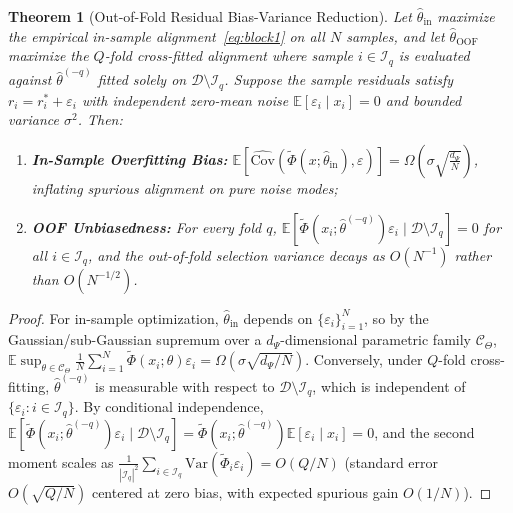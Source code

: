 \documentclass[11pt]{article}
\newtheorem{theorem}{Theorem}
\newcommand{\E}{\mathbb{E}}
\newcommand{\abs}[1]{\left\lvert #1 \right\rvert}
\begin{document}
\begin{theorem}[Out-of-Fold Residual Bias-Variance Reduction]
\label{thm:oof}
Let $\hat{\theta}_{\mathrm{in}}$ maximize the empirical in-sample alignment~\eqref{eq:block1} on all $N$ samples, and let $\hat{\theta}_{\mathrm{OOF}}$ maximize the $Q$-fold cross-fitted alignment where sample $i \in \mathcal{I}_q$ is evaluated against $\hat{\theta}^{(-q)}$ fitted solely on $\mathcal{D} \setminus \mathcal{I}_q$. Suppose the sample residuals satisfy $r_i = r_i^* + \varepsilon_i$ with independent zero-mean noise $\E[\varepsilon_i \mid x_i] = 0$ and bounded variance $\sigma^2$. Then:
\begin{enumerate}
    \item \textbf{In-Sample Overfitting Bias:} $\E[\hat{\mathrm{Cov}}(\tilde{\Phi}(x; \hat{\theta}_{\mathrm{in}}), \varepsilon)] = \Omega\!\left(\sigma \sqrt{\frac{d_\Psi}{N}}\right)$, inflating spurious alignment on pure noise modes;
    \item \textbf{OOF Unbiasedness:} For every fold $q$, $\E[\tilde{\Phi}(x_i; \hat{\theta}^{(-q)}) \varepsilon_i \mid \mathcal{D} \setminus \mathcal{I}_q] = 0$ for all $i \in \mathcal{I}_q$, and the out-of-fold selection variance decays as $O(N^{-1})$ rather than $O(N^{-1/2})$.
\end{enumerate}
\end{theorem}
\begin{proof}
For in-sample optimization, $\hat{\theta}_{\mathrm{in}}$ depends on $\{\varepsilon_i\}_{i=1}^N$, so by the Gaussian/sub-Gaussian supremum over a $d_\Psi$-dimensional parametric family $\mathcal{C}_\Theta$, $\E\sup_{\theta \in \mathcal{C}_\Theta} \frac{1}{N}\sum_{i=1}^N \tilde{\Phi}(x_i;\theta)\varepsilon_i = \Omega(\sigma\sqrt{d_\Psi/N})$. Conversely, under $Q$-fold cross-fitting, $\hat{\theta}^{(-q)}$ is measurable with respect to $\mathcal{D} \setminus \mathcal{I}_q$, which is independent of $\{\varepsilon_i : i \in \mathcal{I}_q\}$. By conditional independence, $\E[\tilde{\Phi}(x_i;\hat{\theta}^{(-q)})\varepsilon_i \mid \mathcal{D} \setminus \mathcal{I}_q] = \tilde{\Phi}(x_i;\hat{\theta}^{(-q)})\E[\varepsilon_i \mid x_i] = 0$, and the second moment scales as $\frac{1}{\abs{\mathcal{I}_q}^2}\sum_{i \in \mathcal{I}_q} \mathrm{Var}(\tilde{\Phi}_i \varepsilon_i) = O(Q/N)$ (standard error $O(\sqrt{Q/N})$ centered at zero bias, with expected spurious gain $O(1/N)$).
\end{proof}
\end{document}
